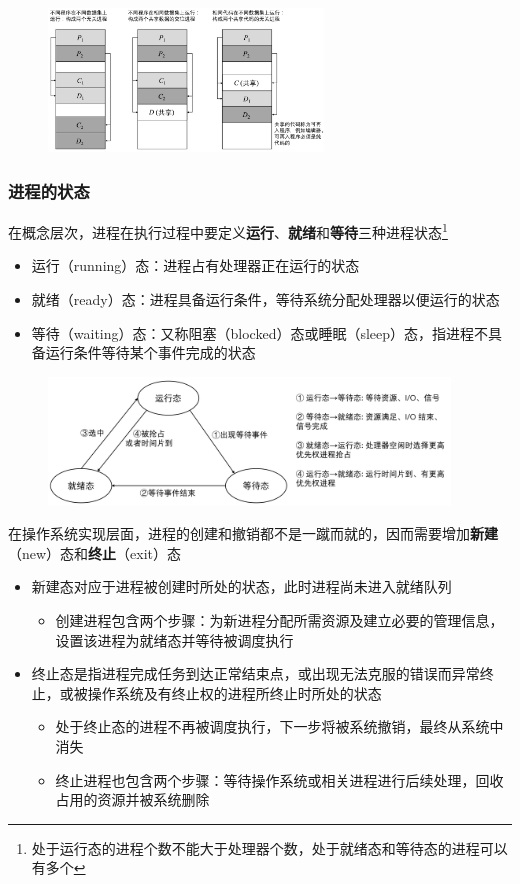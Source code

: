\documentclass[cs4size,a4paper,10pt]{ctexart}
\begin{document}
	\begin{figure}[H]
		\centering
		\includegraphics[width=0.65\textwidth]{img/2.3.1.1}
	\end{figure}


	\subsubsection{进程的状态}
	在概念层次，进程在执行过程中要定义\textbf{运行}、\textbf{就绪}和\textbf{等待}三种进程状态\footnote{处于运行态的进程个数不能大于处理器个数，处于就绪态和等待态的进程可以有多个}
	\begin{itemize}
		\item 运行（running）态：进程占有处理器正在运行的状态
		\item 就绪（ready）态：进程具备运行条件，等待系统分配处理器以便运行的状态
		\item 等待（waiting）态：又称阻塞（blocked）态或睡眠（sleep）态，指进程不具备运行条件等待某个事件完成的状态
	\end{itemize}
	\begin{figure}[H]
		\centering
		\includegraphics[width=0.95\textwidth]{img/2.3.1.2.1}
	\end{figure}
	
	在操作系统实现层面，进程的创建和撤销都不是一蹴而就的，因而需要增加\textbf{新建}（new）态和\textbf{终止}（exit）态
	\begin{itemize}
		\item 新建态对应于进程被创建时所处的状态，此时进程尚未进入就绪队列
		\begin{itemize}
			\item 创建进程包含两个步骤：为新进程分配所需资源及建立必要的管理信息，设置该进程为就绪态并等待被调度执行
		\end{itemize}
		\item 终止态是指进程完成任务到达正常结束点，或出现无法克服的错误而异常终止，或被操作系统及有终止权的进程所终止时所处的状态
		\begin{itemize}
			\item 处于终止态的进程不再被调度执行，下一步将被系统撤销，最终从系统中消失
			\item 终止进程也包含两个步骤：等待操作系统或相关进程进行后续处理，回收占用的资源并被系统删除
		\end{itemize}
	\end{itemize}
\end{document}
